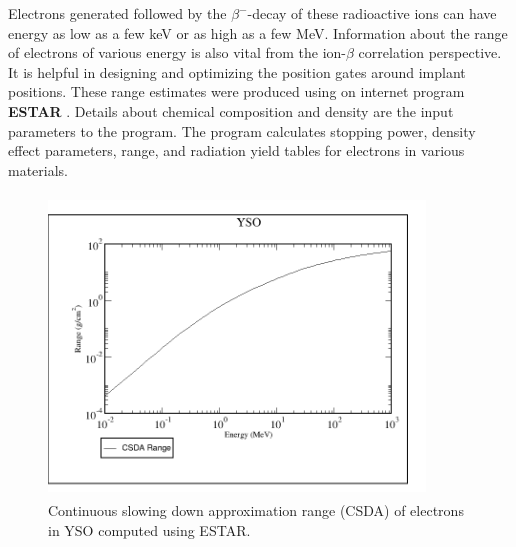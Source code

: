 Electrons generated followed by the $\beta^{-}$-decay of these radioactive ions can have energy as low as a few keV or as high as a few MeV. Information about the range of electrons of various energy is also vital from the ion-$\beta$ correlation perspective. It is helpful in designing and optimizing the position gates around implant positions. These range estimates were produced using on internet program \textbf{ESTAR} \citep{estar}. Details about chemical composition and density are the input parameters to the program. The program calculates  stopping power, density effect parameters, range, and radiation yield tables for electrons in various materials.

\begin{figure}[h!]
	\centering
	\includegraphics[width=10cm,height=8cm]{figures/yso_electrons_range.png}
	\caption[Continuous slowing down approximation range (CSDA)]{Continuous slowing down approximation range (CSDA) of electrons in YSO computed using ESTAR.}
	\label{fig:electron_range_yso}
\end{figure}
